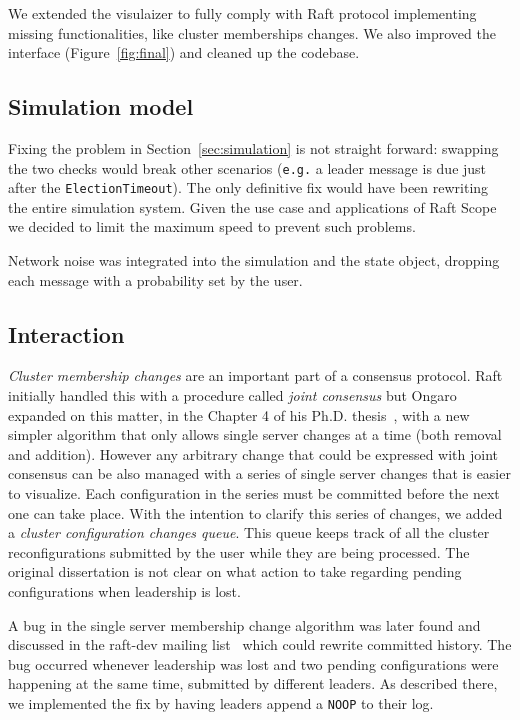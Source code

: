 We extended the visulaizer to fully comply with Raft protocol
implementing missing functionalities, like cluster memberships changes.
We also improved the interface (Figure~\ref{fig:final}) and cleaned up the codebase.

\subsection{Simulation model}
Fixing the problem in Section~\ref{sec:simulation} is not straight forward: swapping the two checks would
break other scenarios (\texttt{e.g.} a leader message is due just after the \texttt{ElectionTimeout}).
The only definitive fix would have been rewriting the entire simulation system.
Given the use case and applications of Raft Scope we decided to limit the maximum speed to prevent such problems.

Network noise was integrated into the simulation and the state object, dropping each message with a probability
set by the user.

\subsection{Interaction}
\emph{Cluster membership changes} are an important part of a consensus protocol.
Raft initially handled this with a procedure called \emph{joint consensus}
but Ongaro expanded on this matter, in the Chapter 4 of his Ph.D. thesis~\cite{ongaro2014consensus},
with a new simpler algorithm that only allows single server changes at a time (both removal and addition).
However any arbitrary change that could be expressed with joint consensus
can be also managed with a series of single server changes that is easier to visualize.
Each configuration in the series must be committed before the next one can take place.
With the intention to clarify this series of changes, we added a \emph{cluster configuration changes queue}.
This queue keeps track of all the cluster reconfigurations submitted by the user while they are being processed.
The original dissertation is not clear on what action to take regarding pending configurations when leadership is lost.

A bug in the single server membership change algorithm was later found and discussed in the raft-dev mailing list~\cite{bug} which
could rewrite committed history. The bug occurred whenever leadership was lost and two pending configurations were happening
at the same time, submitted by different leaders. As described there, we implemented the fix by having leaders append a \texttt{NOOP} to their log.

